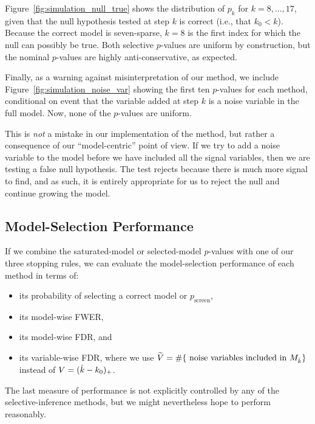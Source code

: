 \documentclass{article}
\begin{document}
Figure~\ref{fig:simulation_null_true} shows the distribution of $p_k$ for $k = 8, \ldots, 17$, given that the null hypothesis tested at step $k$ is correct (i.e., that $k_0< k$). Because the correct model is seven-sparse, $k=8$ is the first index for which the null can possibly be true. Both selective $p$-values are uniform by construction, but the nominal $p$-values are highly anti-conservative, as expected.

Finally, as a warning against misinterpretation of our method, we include Figure~\ref{fig:simulation_noise_var} showing the first ten $p$-values for each method, conditional on event that the variable added at step $k$ is a noise variable in the full model. Now, none of the $p$-values are uniform. 

This is {\em not} a mistake in our implementation of the method, but rather a consequence of our ``model-centric'' point of view. If we try to add a noise variable to the model before we have included all the signal variables, then we are testing a false null hypothesis. The test rejects because there is much more signal to find, and as such, it is entirely appropriate for us to reject the null and continue growing the model.

\subsection{Model-Selection Performance}

If we combine the saturated-model or selected-model $p$-values with one of our three stopping rules, we can evaluate the model-selection performance of each method in terms of:
\begin{itemize}
\item its probability of selecting a correct model or $p_{\text{screen}}$,
\item its model-wise FWER,
\item its model-wise FDR, and
\item its variable-wise FDR, where we use $\widetilde{V}= \#\{\text{ noise variables included in } M_{\hat{k}}\}$ instead of $V=(\hat{k}-k_0)_+$.
\end{itemize} 
The last measure of performance is not explicitly controlled by any of the selective-inference methods, but we might nevertheless hope to perform reasonably. 

\end{document}
